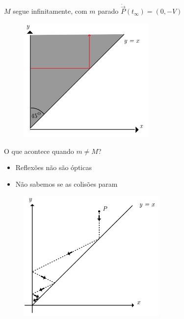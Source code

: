 \documentclass{beamer}
\begin{document}
\begin{frame}{$M$ segue infinitamente, com $m$ parado}
  $\dot{\vec{P}}(t_{\infty})=(0,-V)$
  \begin{figure}
    \centering
    \includegraphics[width=0.6\textwidth]{images/image1-5.png}
  \end{figure}
\end{frame}

\begin{frame}{O que acontece quando $m \neq M$?}
  \begin{itemize}
    \item Reflexões não são ópticas
    \item Não sabemos se as colisões param
  \end{itemize}
  \begin{figure}
    \centering
    \includegraphics[width=0.65\textwidth]{images/image-2.png}
  \end{figure}
\end{frame}
\end{document}
